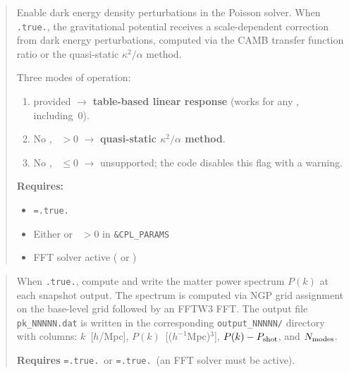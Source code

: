 \label{param:de_perturb}

\begin{quote}
Enable dark energy density perturbations in the Poisson solver.
When \texttt{.true.}, the gravitational potential receives a
scale-dependent correction from dark energy perturbations, computed
via the CAMB transfer function ratio or the quasi-static
$\kappa^2/\alpha$ method.

Three modes of operation:
\begin{enumerate}[nosep]
  \item {} provided $\to$ \textbf{table-based linear
    response} (works for any , including~0).
  \item No , ~$> 0$ $\to$
    \textbf{quasi-static $\kappa^2/\alpha$ method}.
  \item No , ~$\leq 0$ $\to$
    unsupported; the code disables this flag with a warning.
\end{enumerate}

\textbf{Requires:}
\begin{itemize}[nosep]
  \item {}\texttt{=.true.}
  \item Either  or ~$> 0$
        in \texttt{\&CPL\_PARAMS}
  \item FFT solver active ( or )
\end{itemize}

\end{quote}

\label{param:dump_pk}

\begin{quote}
When \texttt{.true.}, compute and write the matter power spectrum
$P(k)$ at each snapshot output.  The spectrum is computed via NGP
grid assignment on the base-level grid followed by an FFTW3 FFT.
The output file \texttt{pk\_NNNNN.dat} is written in the corresponding
\texttt{output\_NNNNN/} directory with columns:
$k$~[$h$/Mpc], $P(k)$~[($h^{-1}$Mpc)$^3$],
$P(k) - P_{\rm shot}$, and $N_{\rm modes}$.

\textbf{Requires} \texttt{=.true.}\ or
\texttt{=.true.}\ (an FFT solver must be active).

\end{quote}

